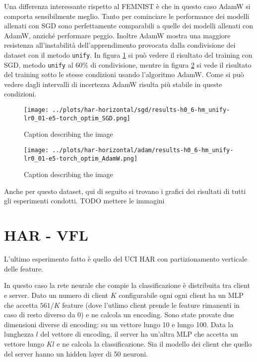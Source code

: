 Una differenza interessante rispetto al FEMNIST è che in questo 
caso AdamW si comporta sensibilmente meglio. Tanto per cominciare
le performance dei modelli allenati con SGD sono perfettamente 
comparabili a quelle dei modelli allenati con AdamW, anziché 
performare peggio. Inoltre AdamW mostra una maggiore resistenza 
all'instabilità dell'apprendimento provocata dalla condivisione 
dei dataset con il metodo \texttt{unify}. In figura 
\ref{fig:haru6sgd} si può vedere il risultato del training con SGD,
metodo \texttt{unify} al 60\% di condivisione, mentre in figura 
\ref{fig:haru6adam} si vede il risultato del training sotto le 
stesse condizioni usando l'algoritmo AdamW. Come si può vedere 
dagli intervalli di incertezza AdamW risulta più stabile in 
queste condizioni.
\begin{figure}[htbp]  %
    \centering
    \texttt{[image: ../plots/har-horizontal/sgd/results-h0\_6-hm\_unify-lr0\_01-e5-torch\_optim\_SGD.png]}
    \caption{Caption describing the image}
    \label{fig:haru6sgd}
\end{figure}
\begin{figure}[htbp]  %
    \centering
    \texttt{[image: ../plots/har-horizontal/adam/results-h0\_6-hm\_unify-lr0\_01-e5-torch\_optim\_AdamW.png]}
    \caption{Caption describing the image}
    \label{fig:haru6adam}
\end{figure}

Anche per questo dataset, qui di seguito si trovano i grafici dei
risultati di tutti gli esperimenti condotti.
TODO mettere le immagini


\section{HAR - VFL}
L'ultimo esperimento fatto è quello del UCI HAR con partizionamento 
verticale delle feature.

In questo caso la rete neurale che compie la classificazione è 
distribuita tra client e server. Dato un numero di client \(K\) 
configurabile ogni ogni client ha un MLP che accetta \(561 / K\)
feature (dove l'utlimo client prende le feature rimanenti in caso di 
resto diverso da 0) e ne calcola un encoding. Sono state provate due 
dimensioni diverse di encoding: su un vettore lungo 10 e lungo 100.
Data la lunghezza \(l\) del vettore di encoding, il server ha un'altra 
MLP che accetta un vettore lungo \(Kl\) e ne calcola la classificazione.
Sia il modello dei client che quello del server hanno un hidden layer 
di 50 neuroni.

